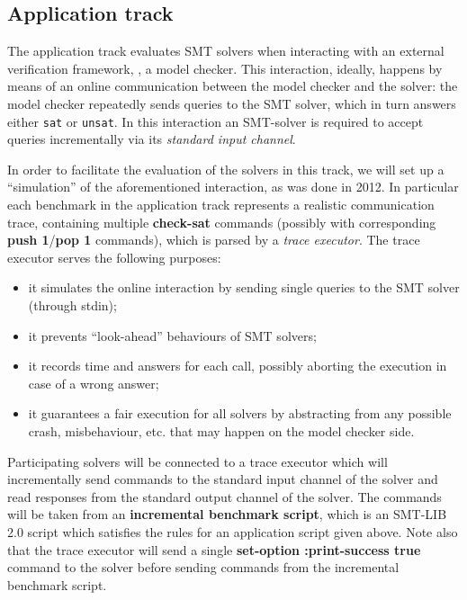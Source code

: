 \documentclass[12pt]{article}
\newcommand{\akey}[1]{\textbf{#1}}
\begin{document}
\subsection{Application track}
\label{sec:exec:application}

The application track evaluates SMT solvers when interacting
with an external verification framework, \eg, a model
checker. This interaction, ideally, happens by means of an online
communication between the model checker and the solver: the model
checker repeatedly sends queries to the SMT solver, which in turn
answers either \texttt{sat} or \texttt{unsat}.  In this interaction an SMT-solver is
required to accept queries incrementally via its {\em standard input channel}.

In order to facilitate the evaluation of the solvers in this track, we
will set up a ``simulation'' of the aforementioned interaction, as was done in 2012. In
particular each benchmark in the application track represents a realistic
communication trace, containing multiple \akey{check-sat} commands (possibly
with corresponding \akey{push 1}/\akey{pop 1} commands), which
is parsed by a {\em trace executor}. The trace executor serves the following purposes:
\begin{itemize}
\item it simulates the online interaction by sending single queries to the SMT solver
      (through stdin);
\item it prevents ``look-ahead'' behaviours of SMT solvers;
\item it records time and answers for each call, possibly aborting the execution
      in case of a wrong answer;
\item it guarantees a fair execution for all solvers by abstracting from any possible
      crash, misbehaviour, etc. that may happen on the model checker side.
\end{itemize}

Participating solvers will be connected to a trace executor 
which will incrementally send commands to the standard input channel of the solver
and read responses from the standard output channel of the solver.
The commands will be taken from an \textbf{incremental benchmark script},
which is an SMT-LIB 2.0 script which satisfies the rules for an application script given above.
Note also that the trace executor will send a single 
\akey{set-option :print-success true} command to the solver before 
sending commands from the incremental benchmark script.
\end{document}
